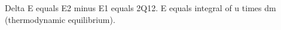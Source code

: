 Delta E equals E2 minus E1 equals 2Q12.  
E equals integral of u times dm (thermodynamic equilibrium).